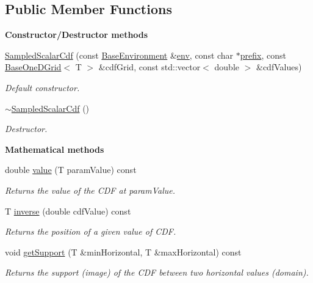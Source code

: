 \subsection*{Public Member Functions}
\begin{Indent}{\bf Constructor/\-Destructor methods}\par
\begin{DoxyCompactItemize}
\item 
\hyperlink{class_q_u_e_s_o_1_1_sampled_scalar_cdf_aa1b09a58b4afb1b8c1c822dd4575faad}{Sampled\-Scalar\-Cdf} (const \hyperlink{class_q_u_e_s_o_1_1_base_environment}{Base\-Environment} \&\hyperlink{class_q_u_e_s_o_1_1_base_scalar_cdf_a70c89dd2ad294be170338a283fc58ff3}{env}, const char $\ast$\hyperlink{class_q_u_e_s_o_1_1_base_scalar_cdf_aafb3eaf3bf1d7269073e9c77bd8c766d}{prefix}, const \hyperlink{class_q_u_e_s_o_1_1_base_one_d_grid}{Base\-One\-D\-Grid}$<$ T $>$ \&cdf\-Grid, const std\-::vector$<$ double $>$ \&cdf\-Values)
\begin{DoxyCompactList}\small\item\em Default constructor. \end{DoxyCompactList}\item 
\hyperlink{class_q_u_e_s_o_1_1_sampled_scalar_cdf_ae2b5a724fcecef81ef74f8d52b021fcb}{$\sim$\-Sampled\-Scalar\-Cdf} ()
\begin{DoxyCompactList}\small\item\em Destructor. \end{DoxyCompactList}\end{DoxyCompactItemize}
\end{Indent}
\begin{Indent}{\bf Mathematical methods}\par
\begin{DoxyCompactItemize}
\item 
double \hyperlink{class_q_u_e_s_o_1_1_sampled_scalar_cdf_a3eb93ff8c14d2b66bf692033a2a3b8b6}{value} (T param\-Value) const 
\begin{DoxyCompactList}\small\item\em Returns the value of the C\-D\-F at {\ttfamily param\-Value}. \end{DoxyCompactList}\item 
T \hyperlink{class_q_u_e_s_o_1_1_sampled_scalar_cdf_a685b0c343b3ab320680c132c836fb1da}{inverse} (double cdf\-Value) const 
\begin{DoxyCompactList}\small\item\em Returns the position of a given value of C\-D\-F. \end{DoxyCompactList}\item 
void \hyperlink{class_q_u_e_s_o_1_1_sampled_scalar_cdf_ab1d99d5dcc9dc79b50501caf80154c39}{get\-Support} (T \&min\-Horizontal, T \&max\-Horizontal) const 
\begin{DoxyCompactList}\small\item\em Returns the support (image) of the C\-D\-F between two horizontal values (domain). \end{DoxyCompactList}\end{DoxyCompactItemize}
\end{Indent}
